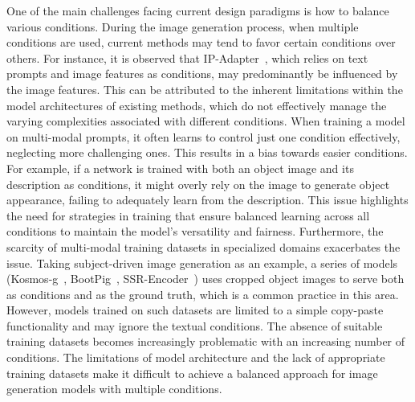 One of the main challenges facing current design paradigms is how to balance various conditions. During the image generation process, when multiple conditions are used, current methods may tend to favor certain conditions over others. For instance, it is observed that IP-Adapter~\cite{ye2023ip}, which relies on text prompts and image features as conditions, may predominantly be influenced by the image features. 
This can be attributed to the inherent limitations within the model architectures of existing methods, which do not effectively manage the varying complexities associated with different conditions. When training a model on multi-modal prompts, it often learns to control just one condition effectively, neglecting more challenging ones. This results in a bias towards easier conditions. For example, if a network is trained with both an object image and its description as conditions, it might overly rely on the image to generate object appearance, failing to adequately learn from the description. This issue highlights the need for strategies in training that ensure balanced learning across all conditions to maintain the model's versatility and fairness.
Furthermore, the scarcity of multi-modal training datasets in specialized domains exacerbates the issue. Taking subject-driven image generation as an example, a series of models (Kosmos-g~\cite{pan2023kosmos}, BootPig~\cite{purushwalkam2024bootpig}, SSR-Encoder~\cite{zhang2023ssr}) uses cropped object images to serve both as conditions and as the ground truth, which is a common practice in this area. However, models trained on such datasets are limited to a simple copy-paste functionality and may ignore the textual conditions. The absence of suitable training datasets becomes increasingly problematic with an increasing number of conditions. The limitations of model architecture and the lack of appropriate training datasets make it difficult to achieve a balanced approach for image generation models with multiple conditions.



